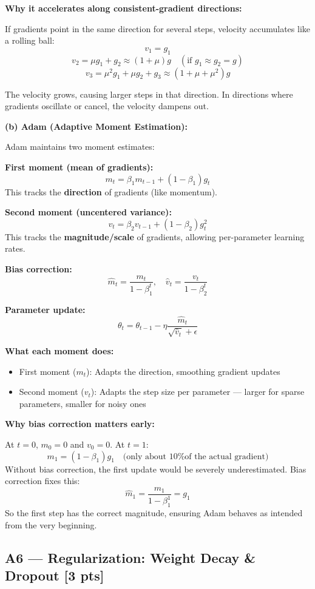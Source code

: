 \documentclass[11pt,a4paper]{article}
\begin{document}
\textbf{Why it accelerates along consistent-gradient directions:}

If gradients point in the same direction for several steps, velocity accumulates like a rolling ball:
\[
v_1 = g_1
\]
\[
v_2 = \mu g_1 + g_2 \approx (1+\mu)g \quad (\text{if } g_1 \approx g_2 = g)
\]
\[
v_3 = \mu^2 g_1 + \mu g_2 + g_3 \approx (1+\mu+\mu^2)g
\]

The velocity grows, causing larger steps in that direction. In directions where gradients oscillate or cancel, the velocity dampens out.

\textbf{(b) Adam (Adaptive Moment Estimation):}

Adam maintains two moment estimates:

\textbf{First moment (mean of gradients):}
\[
m_t = \beta_1 m_{t-1} + (1-\beta_1)g_t
\]
This tracks the \textbf{direction} of gradients (like momentum).

\textbf{Second moment (uncentered variance):}
\[
v_t = \beta_2 v_{t-1} + (1-\beta_2)g_t^2
\]
This tracks the \textbf{magnitude/scale} of gradients, allowing per-parameter learning rates.

\textbf{Bias correction:}
\[
\hat{m}_t = \frac{m_t}{1-\beta_1^t}, \quad \hat{v}_t = \frac{v_t}{1-\beta_2^t}
\]

\textbf{Parameter update:}
\[
\theta_t = \theta_{t-1} - \eta \frac{\hat{m}_t}{\sqrt{\hat{v}_t} + \epsilon}
\]

\textbf{What each moment does:}
\begin{itemize}
    \item First moment ($m_t$): Adapts the direction, smoothing gradient updates
    \item Second moment ($v_t$): Adapts the step size per parameter — larger for sparse parameters, smaller for noisy ones
\end{itemize}

\textbf{Why bias correction matters early:}

At $t=0$, $m_0 = 0$ and $v_0 = 0$. At $t=1$:
\[
m_1 = (1-\beta_1)g_1 \quad \text{(only about 10\% of the actual gradient)}
\]
Without bias correction, the first update would be severely underestimated. Bias correction fixes this:
\[
\hat{m}_1 = \frac{m_1}{1-\beta_1^1} = g_1
\]
So the first step has the correct magnitude, ensuring Adam behaves as intended from the very beginning.

\subsection*{A6 --- Regularization: Weight Decay \& Dropout \hfill [3 pts]}
\end{document}
